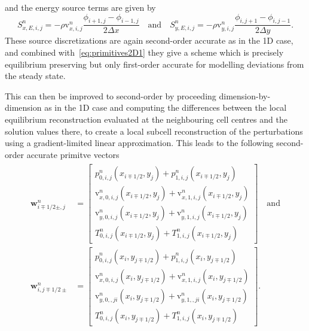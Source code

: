 and the energy source terms are given by
\begin{equation}
S_{x,E,i,j}^n=-\rho \mathrm{v}_{x,i,j}^n\frac{\phi_{i+1,j}-\phi_{i-1,j}}{2\Delta x} \quad \textrm{and} \quad S_{y,E,i,j}^n=-\rho \mathrm{v}_{y,i,j}^n\frac{\phi_{i,j+1}-\phi_{i,j-1}}{2\Delta y}.
\end{equation}
These source discretizations are again second-order accurate as in the 1D case, and combined with~\eqref{eq:primitives2D1} they give a scheme which is precisely equilibrium preserving but only first-order accurate for modelling deviations from the steady state.

This can then be improved to second-order by proceeding dimension-by-dimension as in the 1D case and computing the differences between the local equilibrium reconstruction evaluated at the neighbouring cell centres and the solution values there, to create a local subcell reconstruction of the perturbations using a gradient-limited linear approximation. This leads to the following second-order accurate primitve vectors
\begin{align} \label{eq:primitives2D2}
\begin{split}
\mathbf{w}_{i\mp1/2\pm,j}^n&=
\begin{bmatrix}
p_{0,i,j}^n(x_{i\mp1/2},y_j)+p_{1,i,j}^n(x_{i\mp1/2},y_j) \\ \mathrm{v}_{x,0,i,j}^n(x_{i\mp1/2},y_j)+\mathrm{v}_{x,1,i,j}^n(x_{i\mp1/2},y_j) \\ \mathrm{v}_{y,0,i,j}^n(x_{i\mp1/2},y_j)+\mathrm{v}_{y,1,i,j}^n(x_{i\mp1/2},y_j) \\ T_{0,i,j}^n(x_{i\mp1/2},y_j)+T_{1,i,j}^n(x_{i\mp1/2},y_j)
\end{bmatrix} \quad \textrm{and} \\
\mathbf{w}_{i,j\mp1/2\pm}^n&=
\begin{bmatrix}
p_{0,i,j}^n(x_i,y_{j\mp1/2})+p_{1,i,j}^n(x_i,y_{j\mp1/2}) \\ \mathrm{v}_{x,0,i,j}^n(x_i,y_{j\mp1/2})+\mathrm{v}_{x,1,i,j}^n(x_i,y_{j\mp1/2}) \\ \mathrm{v}_{y,0,,ji}^n(x_i,y_{j\mp1/2})+\mathrm{v}_{y,1,,ji}^n(x_i,y_{j\mp1/2}) \\ T_{0,i,j}^n(x_i,y_{j\mp1/2})+T_{1,i,j}^n(x_i,y_{j\mp1/2})
\end{bmatrix}.
\end{split}
\end{align}
